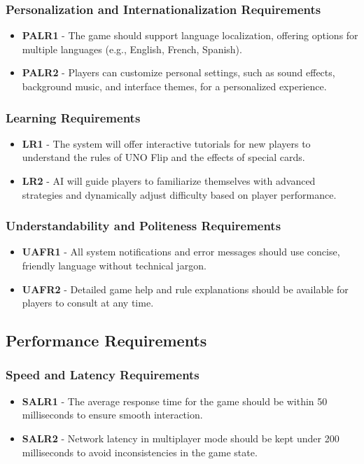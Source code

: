 \documentclass[12pt, titlepage]{article}
\begin{document}
\subsubsection{Personalization and Internationalization Requirements}
\begin{itemize}
    \item \textbf{PALR1} - The game should support language localization, offering options for multiple languages (e.g., English, French, Spanish).
    \item \textbf{PALR2} - Players can customize personal settings, such as sound effects, background music, and interface themes, for a personalized experience.
\end{itemize}

\subsubsection{Learning Requirements}
\begin{itemize}
    \item \textbf{LR1} - The system will offer interactive tutorials for new players to understand the rules of UNO Flip and the effects of special cards.
    \item \textbf{LR2} - AI will guide players to familiarize themselves with advanced strategies and dynamically adjust difficulty based on player performance.
\end{itemize}

\subsubsection{Understandability and Politeness Requirements}
\begin{itemize}
    \item \textbf{UAFR1} - All system notifications and error messages should use concise, friendly language without technical jargon.
    \item \textbf{UAFR2} - Detailed game help and rule explanations should be available for players to consult at any time.
\end{itemize}

\subsection{Performance Requirements}

\subsubsection{Speed and Latency Requirements}
\begin{itemize}
    \item \textbf{SALR1} - The average response time for the game should be within 50 milliseconds to ensure smooth interaction.
    \item \textbf{SALR2} - Network latency in multiplayer mode should be kept under 200 milliseconds to avoid inconsistencies in the game state.
\end{itemize}
\end{document}

